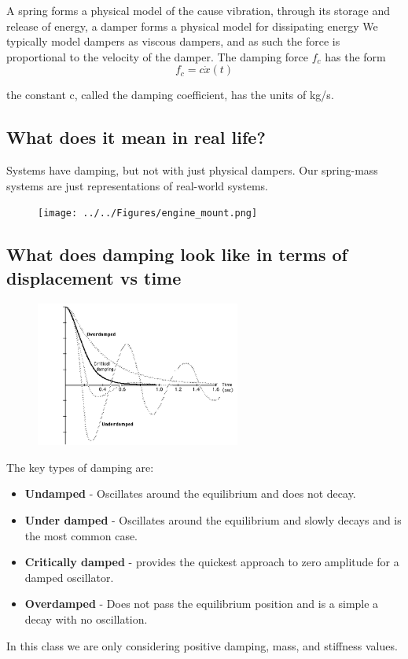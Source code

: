 \documentclass[12pt,a4paper]{article}
\begin{document}
			A spring forms a physical model of the cause vibration, through its storage and release of energy, a damper forms a physical model for dissipating energy We typically model dampers as viscous dampers, and as such the force is proportional to the velocity of the damper. The damping force $f_c$ has the form 
			\begin{equation}
				f_c = c \dot{x}(t)
			\end{equation}
			
			the constant c, called the damping coefficient, has the units of kg/s.
		
		\subsection*{What does it mean in real life?}
		
			Systems have damping, but not with just physical dampers. Our spring-mass systems are just representations of real-world systems.
			
			
			\begin{figure}[H]
				\centering
				\texttt{[image: ../../Figures/engine\_mount.png]}
			\end{figure}

		\subsection*{What does damping look like in terms of displacement vs time}

			\begin{figure}[H]
				\centering
				\includegraphics[width=0.6\textwidth]{../../Figures/Damping_plots.png}
			\end{figure}
			
			The key types of damping are:
			\begin{itemize}
			\item \textbf{Undamped} - Oscillates around the equilibrium and does not decay.
			\item \textbf{Under damped} - Oscillates around the equilibrium and slowly decays  and is the most common case.
			\item \textbf{Critically damped} - provides the quickest approach to zero amplitude for a damped oscillator.
			\item \textbf{Overdamped} - Does not pass the equilibrium position and is a simple a decay with no oscillation.
			\end{itemize}
			In this class we are only considering positive damping, mass, and stiffness values.
			
\end{document}
